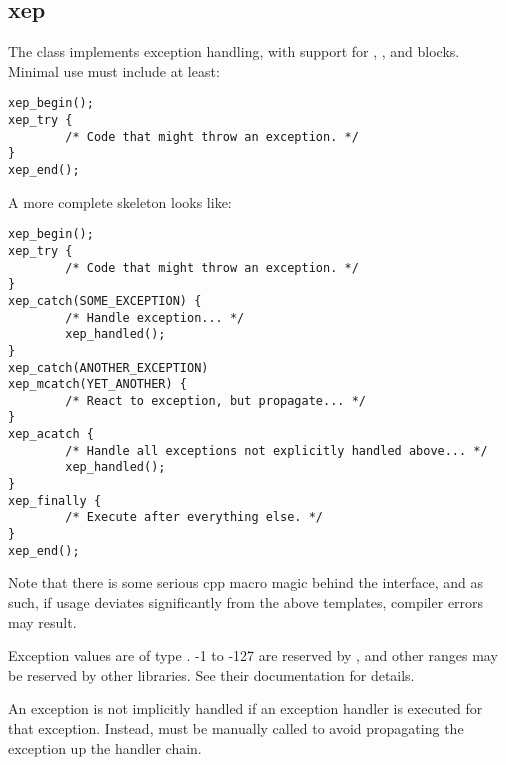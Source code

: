 %
%
%
%
%              

\subsection{xep}
\label{xep}
The  class implements exception handling, with support for
, , and  blocks.
Minimal use must include at least:
\begin{verbatim}
xep_begin();
xep_try {
        /* Code that might throw an exception. */
}
xep_end();
\end{verbatim}

A more complete skeleton looks like:
\begin{verbatim}
xep_begin();
xep_try {
        /* Code that might throw an exception. */
}
xep_catch(SOME_EXCEPTION) {
        /* Handle exception... */
        xep_handled();
}
xep_catch(ANOTHER_EXCEPTION)
xep_mcatch(YET_ANOTHER) {
        /* React to exception, but propagate... */
}
xep_acatch {
        /* Handle all exceptions not explicitly handled above... */
        xep_handled();
}
xep_finally {
        /* Execute after everything else. */
}
xep_end();
\end{verbatim}

Note that there is some serious cpp macro magic behind the 
interface, and as such, if usage deviates significantly from the above
templates, compiler errors may result.

Exception values are of type .  -1 to -127 are reserved by
, and other ranges may be reserved by other libraries.  See
their documentation for details.

An exception is not implicitly handled if an exception handler is executed for
that exception.  Instead,  must be manually called to
avoid propagating the exception up the handler chain.

